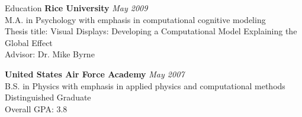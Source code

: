 
\begin{rSection}{Education}
{\bf Rice University} \hfill {\em May 2009} \\ 
M.A. in Psychology with emphasis in computational cognitive modeling \\
Thesis title: Visual Displays: Developing a Computational Model Explaining the Global Effect \\
Advisor: Dr. Mike Byrne
\item {\bf United States Air Force Academy} \hfill {\em May 2007} \\ 
B.S. in Physics with emphasis in applied physics and computational methods \\
Distinguished Graduate \\
Overall GPA: 3.8
\end{rSection}

